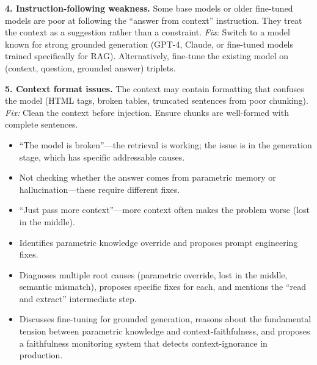 \begin{interviewq}
\textbf{4. Instruction-following weakness.} Some base models or older fine-tuned models are poor at following the ``answer from context'' instruction. They treat the context as a suggestion rather than a constraint.
\textit{Fix:} Switch to a model known for strong grounded generation (GPT-4, Claude, or fine-tuned models trained specifically for RAG). Alternatively, fine-tune the existing model on (context, question, grounded answer) triplets.

\textbf{5. Context format issues.} The context may contain formatting that confuses the model (HTML tags, broken tables, truncated sentences from poor chunking).
\textit{Fix:} Clean the context before injection. Ensure chunks are well-formed with complete sentences.

\redflags
\begin{itemize}
    \item ``The model is broken''---the retrieval is working; the issue is in the generation stage, which has specific addressable causes.
    \item Not checking whether the answer comes from parametric memory or hallucination---these require different fixes.
    \item ``Just pass more context''---more context often makes the problem worse (lost in the middle).
\end{itemize}


\goodgreat
\begin{itemize}
    \item {} Identifies parametric knowledge override and proposes prompt engineering fixes.
    \item {} Diagnoses multiple root causes (parametric override, lost in the middle, semantic mismatch), proposes specific fixes for each, and mentions the ``read and extract'' intermediate step.
    \item {} Discusses fine-tuning for grounded generation, reasons about the fundamental tension between parametric knowledge and context-faithfulness, and proposes a faithfulness monitoring system that detects context-ignorance in production.
\end{itemize}

\end{interviewq}

